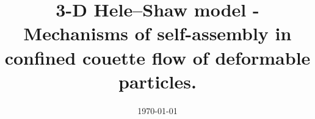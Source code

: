 \documentclass[a4paper, 12pt, oneside]{Thesis}  %
\begin{document}
\frontmatter      %

\title  {3-D Hele--Shaw model - Mechanisms of self-assembly in confined couette flow of deformable particles.}
\addresses  {\groupname\\\deptname\\\univname}  %
\date       {\today}
\subject    {}
\keywords   {}

\maketitle


\fancyhead{}  %
\rhead{\thepage}  %
\lhead{}  %

\pagestyle{fancy}  %




 
 
\end{document}
